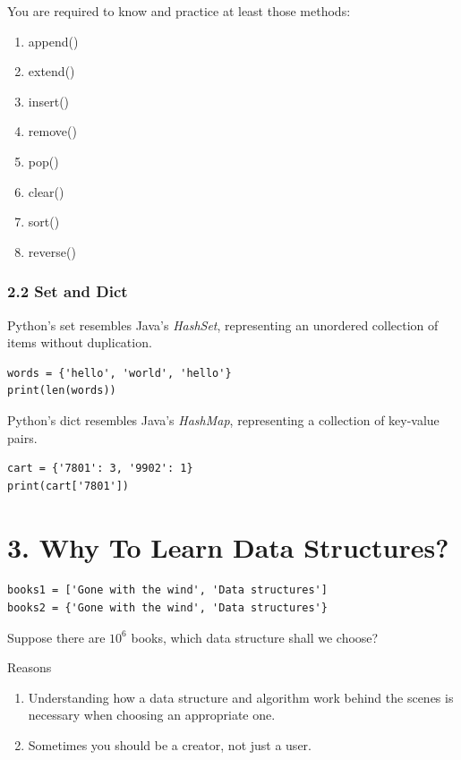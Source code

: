 \documentclass[aspectratio=169, 14pt]{beamer}
\begin{document}
\begin{frame}
You are required to know and practice at least those methods:
\begin{enumerate}
    \item append()
    \item extend()
    \item insert()
    \item remove()
    \item pop()
    \item clear()
    \item sort()
    \item reverse()
\end{enumerate}    

\end{frame}

\begin{frame}[fragile]
    \frametitle{2.2 Set and Dict}
Python's \alert{set} resembles Java's \emph{HashSet}, representing an unordered collection of items without duplication.
\begin{verbatim}
words = {'hello', 'world', 'hello'}
print(len(words))    
\end{verbatim}
\pause
Python's \alert{dict} resembles Java's \emph{HashMap}, representing a collection of key-value pairs.
\begin{verbatim}
cart = {'7801': 3, '9902': 1}
print(cart['7801'])    
\end{verbatim}
\end{frame}


\section{\textcolor{darkmidnightblue}{3. Why To Learn Data Structures?}}

\begin{frame}[fragile]
\begin{verbatim}
books1 = ['Gone with the wind', 'Data structures']
books2 = {'Gone with the wind', 'Data structures'}
\end{verbatim}

Suppose there are $10^6$ books, which data structure shall we choose?

\pause

\begin{block}{Reasons}
    \begin{enumerate}
        \item Understanding how a data structure and algorithm work behind the scenes is necessary when choosing an appropriate one.
        \item Sometimes you should be a creator, not just a user.
    \end{enumerate}
\end{block}
\end{frame}
\end{document}
